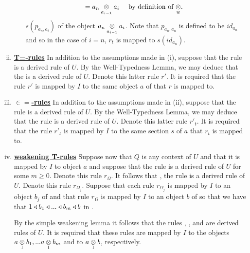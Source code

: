 \begin{definition}
\begin{enumerate}[(i)]
\begin{enumerate}[(a)]
{\begin{align*}
                                 &= \crossx{a_n}{a_i}{a_{i-1}} && \mbox{ by definition of $\crossx{}{}{w}$}.
\end{align*}
} %
$s(p_{a_n,a_i})$ of the object $\crossx{a_n}{a_i}{a_{i-1}}$. Note that $p_{a_n,a_n}$ is defined to be $id_{a_n}$ and so in the case of $i=n$, $r_t$
is mapped to   $s(id_{a_n})$.
\end{enumerate}
\item \underline{\textbf{T=-rules}} 
In addition to the assumptions made in (i), suppose that  
the rule  is a derived rule of $U$. 
By the Well-Typedness Lemma, we may deduce that the
 is a derived rule of $U$. Denote this latter rule $r'$.
It is required that the rule $r'$ is mapped by $I$ to the same object $a$ of \catcw that $r$ is mapped to.

\item \underline{\textbf{$\boldsymbol{\in=}$-rules}} 
In addition to the assumptions made in (ii),  suppose that the rule
is a derived rule of $U$. 
By the Well-Typedness Lemma, we may deduce that the rule
 is a  derived rule of $U$. 
Denote this latter rule $r'_t$.
It is required that the rule $r'_t$ is mapped by $I$ to the same section $s$ of $a$ that $r_t$ is mapped to.

\item \underline{\textbf{weakening T-rules}} 
Suppose now that $Q$ is any context of $U$ and that it is mapped by $I$ to object $a$ and suppose that the rule 
 is a derived rule of $U$ for some $m \geq 0$. Denote this rule $r_\Omega$. 
It follows that \foreachj, the rule    is a derived rule of $U$. Denote this rule $r_{\Omega_j}$.
Suppose that each rule $r_{\Omega_j}$ is mapped by $I$ to an object $b_j$ of \catcw and that rule $r_\Omega$ is mapped by $I$ to an object $b$ of \catcw so that
we have that $1 \base b_1 \base ... \base b_m \base b$ in \catc.

By the simple weakening lemma it follows that the rules
 \kern-6pt, \foreachj, and 
 are  derived rules of $U$. It is required that these rules are mapped by $I$ to the objects
$\crossx{a}{b_1}{1},...\crossx{a}{b_m}{1}$ and to $\crossx{a}{b}{1}$, respectively. 


\end{enumerate}
\end{definition}
